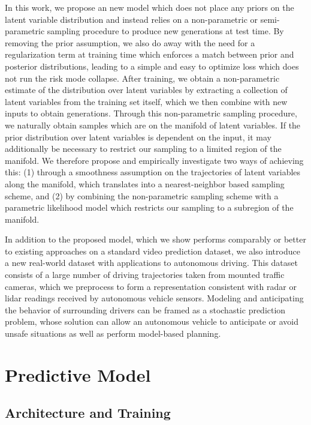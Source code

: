 \documentclass{article}
\begin{document}
In this work, we propose an new model which does not place any priors on the latent variable distribution and instead relies on a non-parametric or semi-parametric sampling procedure to produce new generations at test time.
By removing the prior assumption, we also do away with the need for a regularization term at training time which enforces a match between prior and posterior distributions, leading to a simple and easy to optimize loss which does not run the risk mode collapse.
After training, we obtain a non-parametric estimate of the distribution over latent variables by extracting a collection of latent variables from the training set itself, which we then combine with new inputs to obtain generations.
Through this non-parametric sampling procedure, we naturally obtain samples which are on the manifold of latent variables.
If the prior distribution over latent variables is dependent on the input, it may additionally be necessary to restrict our sampling to a limited region of the manifold.
We therefore propose and empirically investigate two ways of achieving this: (1) through a smoothness assumption on the trajectories of latent variables along the manifold, which translates into a nearest-neighbor based sampling scheme, and (2) by combining the non-parametric sampling scheme with a parametric likelihood model which restricts our sampling to a subregion of the manifold.

In addition to the proposed model, which we show performs comparably or better to existing approaches on a standard video prediction dataset, we also introduce a new real-world dataset with applications to autonomous driving.
This dataset consists of a large number of driving trajectories taken from mounted traffic cameras, which we preprocess to form a representation consistent with radar or lidar readings received by autonomous vehicle sensors.
Modeling and anticipating the behavior of surrounding drivers can be framed as a stochastic prediction problem, whose solution can allow an autonomous vehicle to anticipate or avoid unsafe situations as well as perform model-based planning.


\section{Predictive Model}

\subsection{Architecture and Training}
\end{document}
